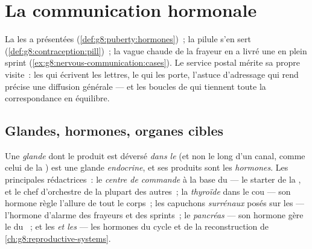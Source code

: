 \chapter{La communication hormonale}\label{ch:g8:hormonal-communication}

La  les a présentées
(\cref{def:g8:puberty:hormones})~; la pilule s'en sert
(\cref{def:g8:contraception:pill})~; la vague chaude de la
frayeur en a livré une en plein sprint
(\cref{ex:g8:nervous-communication:cases}). Le service
postal mérite sa propre visite~: les  qui écrivent
les lettres, le  qui les porte, l'astuce d'adressage qui
rend précise une diffusion générale --- et les boucles de
 qui tiennent toute la correspondance en équilibre.

\section{Glandes, hormones, organes cibles}

\begin{definition}\label{def:g8:hormonal-communication:glands}
Une \emph{glande} dont le produit est déversé
\emph{dans le } (et non le long d'un canal, comme celui
de la ) est une glande \emph{endocrine}, et ses
produits sont les \emph{hormones}. Les
principales rédactrices~: le \emph{centre de commande} à la
base du  --- le starter de la , et le chef
d'orchestre de la plupart des autres~; la \emph{thyroïde}
dans le cou --- son hormone règle l'allure de tout le
corps~; les capuchons \emph{surrénaux} posés sur les 
--- l'hormone d'alarme des frayeurs et des sprints~; le
\emph{pancréas} --- son hormone gère le  du ~;
et les \emph{ et les } --- les hormones du
cycle et de la reconstruction de
\cref{ch:g8:reproductive-systems}.
\end{definition}

